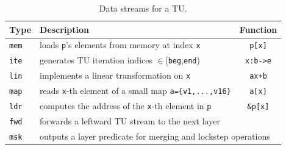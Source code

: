 \begin{table}[htbp!]
\centering
\caption{Data streams for a TU.}
\label{tab:legacy-tmu-data-streams}
\begin{tabular}{@{}llc@{}}
\toprule
\textbf{Type} & \textbf{Description} & \textbf{Function}\\
\midrule
\texttt{mem} & loads \texttt{p}'s elements from memory at index \texttt{x} & \texttt{p[x]}\\
\texttt{ite} & generates TU iteration indices $\in$[\texttt{beg},\texttt{end}) & \texttt{x:b->e}\\
\texttt{lin} & implements a linear transformation on \texttt{x} & \texttt{ax+b}\\
\texttt{map} & reads \texttt{x}-th element of a small map \texttt{a=\{v1,...,v16\}} & \texttt{a[x]}\\
\texttt{ldr} & computes the address of the \texttt{x}-th element in \texttt{p} & \texttt{\&p[x]}\\
\midrule
\texttt{fwd} &\multicolumn{2}{l}{forwards a leftward TU stream to the next layer}\\
\texttt{msk} &\multicolumn{2}{l}{outputs a layer predicate for merging and lockstep operations}\\
\bottomrule 
\end{tabular}
\end{table}
